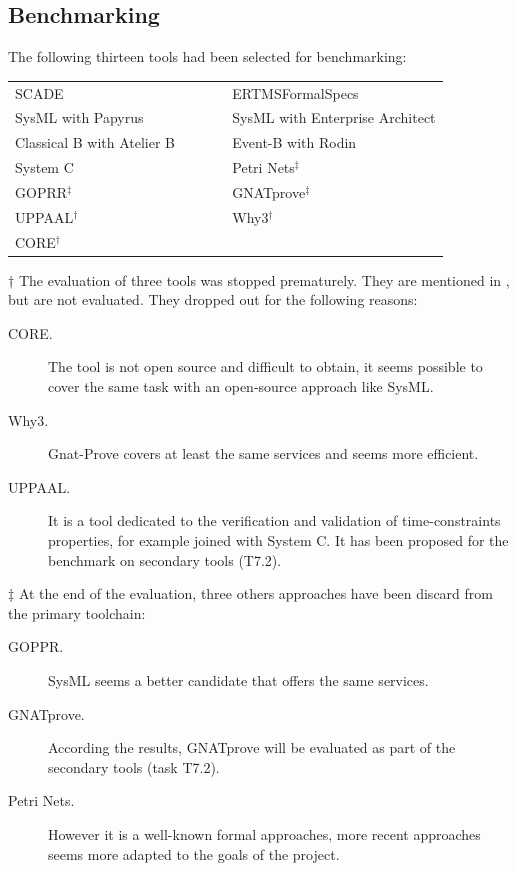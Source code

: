 \subsection{Benchmarking}
\label{sec:benchmarking}

The following thirteen tools had been selected for benchmarking:

\begin{tabular}{ p{0.5\linewidth} p{0.5\linewidth} }
SCADE & ERTMSFormalSpecs \\
SysML with Papyrus & SysML with Enterprise Architect \\
Classical B with Atelier B & Event-B with Rodin \\
System C & Petri Nets$^\ddagger$ \\
GOPRR$^\ddagger$ & GNATprove$^\ddagger$ \\
UPPAAL$^\dagger$ & Why3$^\dagger$ \\
CORE$^\dagger$
\end{tabular}

$\dagger$ The evaluation of three tools was stopped prematurely.  They are mentioned in \citep{WP7_O719}, but are not evaluated.  They dropped out for the following reasons:

\begin{description}
\item[CORE.] The tool is not open source and difficult to obtain, it seems possible to cover the same task with an open-source approach like SysML.
\item[Why3.] Gnat-Prove covers at least the same services and seems more efficient.
\item[UPPAAL.] It is a tool dedicated to the verification and validation of time-constraints properties, for example joined with System C. It has been proposed for the benchmark on secondary tools (T7.2).
\end{description}

$\ddagger$ At the end of the evaluation, three others approaches have been discard from the primary toolchain:

\begin{description}
\item[GOPPR.] SysML seems a better candidate that offers the same services.
\item[GNATprove.] According the results, GNATprove will be evaluated as part of the secondary tools (task T7.2).
\item[Petri Nets.] However it is a well-known formal approaches, more recent approaches seems more adapted to the goals of the project.
\end{description}

